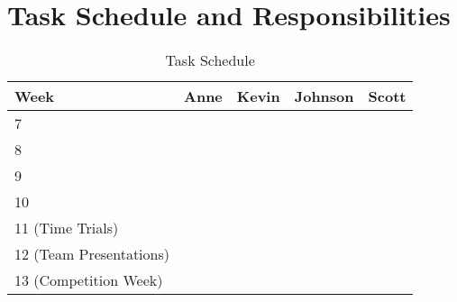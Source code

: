 \documentclass[11pt, oneside]{article} %
\begin{document}
\section{Task Schedule and Responsibilities}

\begin{table}[ht]
	\caption{Task Schedule}
	\centering
	\begin{tabular}{ | p{4.5cm} | p{3cm} | p{3cm} | p{3cm} | p{3cm} |} 
	\hline
	\textbf{Week} & \textbf{Anne} & \textbf{Kevin} & \textbf{Johnson} & \textbf{Scott} \\ \hline 
	7& & & & \\ \hline
	8& & & & \\ \hline
	9& & & & \\ \hline
	10& & & & \\ \hline
	11 (Time Trials)& & & & \\ \hline
	12 (Team Presentations)& & & & \\ \hline
	13 (Competition Week)& & & & \\ \hline
	\end{tabular}
	\label{table:Task Schedule}
\end{table}

\clearpage

\end{document}
